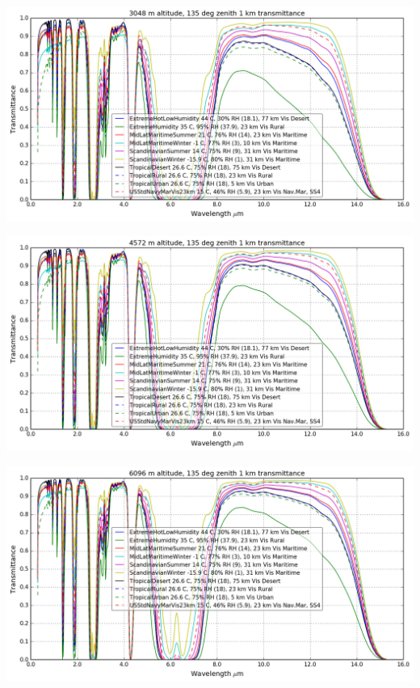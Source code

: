 \documentclass{workpackage}
\begin{document}
\begin{center}
\includegraphics{./pic/Analyse-Standard-Atmospheres_17_13.png}
\end{center}

\begin{center}
\includegraphics{./pic/Analyse-Standard-Atmospheres_17_14.png}
\end{center}

\begin{center}
\includegraphics{./pic/Analyse-Standard-Atmospheres_17_15.png}
\end{center}
\end{document}
